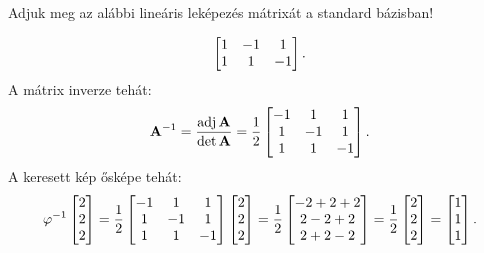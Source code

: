 \begin{exercise}{%
    Adjuk meg az alábbi lineáris leképezés mátrixát a standard bázisban!
  }
{\begin{enumerate}
\[\begin{bmatrix}
                1  & -1 & 1  \\
                1  & 1  & -1 \\
              \end{bmatrix}
              \text.
            \]
            A mátrix inverze tehát:
            \[
              \mathbf{A}^{-1}
              = \frac{\operatorname{adj} \mathbf{A}}{\det \mathbf{A}}
              = \frac{1}{2} \begin{bmatrix}
                -1 & 1  & 1  \\
                1  & -1 & 1  \\
                1  & 1  & -1 \\
              \end{bmatrix}
              \text.
            \]
            A keresett kép ősképe tehát:
            \[
              \varphi^{-1} \begin{bmatrix}
                2 \\ 2 \\ 2
              \end{bmatrix} = \frac{1}{2} \begin{bmatrix}
                -1 & 1  & 1  \\
                1  & -1 & 1  \\
                1  & 1  & -1 \\
              \end{bmatrix} \begin{bmatrix}
                2 \\ 2 \\ 2
              \end{bmatrix} = \frac{1}{2} \begin{bmatrix}
                -2 + 2 + 2 \\ 2 - 2 + 2 \\ 2 + 2 - 2
              \end{bmatrix} = \frac{1}{2} \begin{bmatrix}
                2 \\ 2 \\ 2
              \end{bmatrix} = \begin{bmatrix}
                1 \\ 1 \\ 1
              \end{bmatrix}
              \text.
            \]


\end{enumerate}}
\end{exercise}
